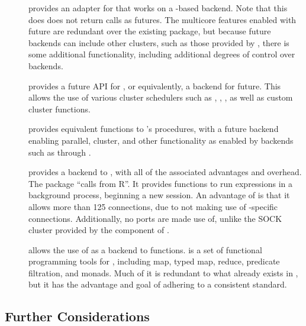 \begin{description}
	\item[]
		\textcite{bengtsson20do} provides an adapter for \cite{microsoft20}
		that works on a -based backend.
		Note that this does does not return  calls as futures.
		The multicore features enabled with future are redundant over the existing  package, but because future backends can include other clusters, such as those provided by , there is some additional functionality, including additional degrees of control over backends.
	\item[]
		\cite{bengtsson19batch} provides a future API for
		\cite{lang17}, or equivalently, a  backend for
		future.
		This allows the use of various cluster schedulers such as , , , as well as custom cluster functions.
	\item[]
		\textcite{bengtsson20apply} provides equivalent functions to \R{}'s
		 procedures, with a future backend enabling parallel,
		cluster, and other functionality as enabled by backends such as
		 through .
	\item[]
		\textcite{bengtsson19callr} provides a \cite{csardi20} backend to
		, with all of the associated advantages and overhead. The  package ``calls \R{} from R''.
		It provides functions to run expressions in a background \R{} process, beginning a new session.
		An advantage of  is that it allows more than 125 connections, due to not making use of \R{}-specific connections.
		Additionally, no ports are made use of, unlike the SOCK cluster provided by the  component of .
	\item[]
		\textcite{vaughan18} allows the use of  as a backend to 
		functions.  is a set of functional programming tools for \R{},
		including map, typed map, reduce, predicate filtration, and monads.
		Much of it is redundant to what already exists in \R{}, but it has the advantage and goal of adhering to a consistent standard.
\end{description}

\subsection{Further Considerations}\label{subsec:further-considerations}

